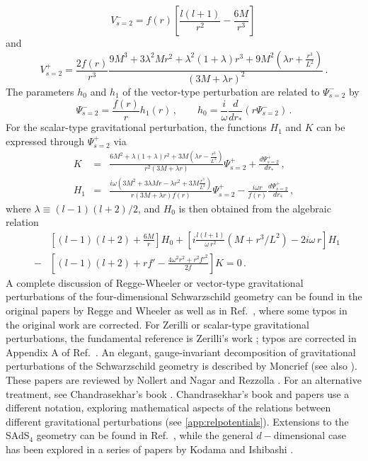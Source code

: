 \documentclass[]{iopart}
\def\beq{\begin{eqnarray}}
\def\eeq{\end{eqnarray}}
\begin{document}
%
\begin{equation}
V_{s=2}^{-}=  f(r)
\left\lbrack\frac{l(l+1)}{r^2}-\frac{6M}{r^3}\right\rbrack\,
\label{vodd}
\end{equation}
%
and 
\begin{equation}
V_{s=2}^{+}= \frac{2f(r)}{r^3}
\frac{9M^3+3\lambda^2Mr^2+\lambda^2\left(1+\lambda\right)r^3+9M^2\left(\lambda
r+\frac{r^3}{L^2}\right)} {\left(3M+\lambda
r\right)^2} \,. \label{veven}
\end{equation}
%
The parameters $h_0$ and $h_1$ of the vector-type perturbation are related to
$\Psi^-_{s=2}$ by
%
\begin{equation}
\Psi^-_{s=2}=  \frac{f(r)}{r} h_1(r)\,,\qquad
h_0=\frac{i}{\omega}\frac{d}{dr_*}\left(r\Psi^-_{s=2}\right)\,.
\label{qodd}
\end{equation}
%
For the scalar-type gravitational perturbation, the functions $H_1$ and $K$
can be expressed through $\Psi^+_{s=2}$ via
%
\begin{eqnarray}
K&=& \frac{6M^2+\lambda \left(1+\lambda\right)r^2+3M\left(\lambda
r-\frac{r^3}{L^2}\right)} {r^2\left(3M+\lambda r\right)}
\Psi^+_{s=2}
+\frac{d\Psi^+_{s=2}}{dr_*} \,, \\
H_1&=& \frac{i\omega\left(3M^2+3\lambda Mr-\lambda r^2+3M
\frac{r^3}{L^2}\right)} {r \left(3M+\lambda r\right)
f(r)}\Psi^+_{s=2} -
\frac{i \omega r}{f(r)}\frac{d\Psi^+_{s=2}}{dr_*}\,, \label{4.11}
\end{eqnarray}
%
where $\lambda\equiv (l-1)(l+2)/2$, and $H_0$ is then obtained from the
algebraic relation
%
\beq
&&\left [(l-1)(l+2)+\frac{6M}{r}\right ]H_0+\left[i\frac{l(l+1)}{\omega\,r^2}(M+r^3/L^2)-2i\omega\,r\right ]H_1\,\nonumber\\
%
&-&\left [(l-1)(l+2)+rf'-\frac{4\omega^2r^2+r^2f'^2}{2f}\right ]K=0\,.
\eeq
%
A complete discussion of Regge-Wheeler or vector-type gravitational
perturbations of the four-dimensional Schwarzschild geometry can be found in
the original papers by Regge and Wheeler \cite{Regge:1957rw} as well as in
Ref.~\cite{Edelstein:1970sk}, where some typos in the original work are
corrected. For Zerilli or scalar-type gravitational perturbations, the
fundamental reference is Zerilli's work \cite{Zerilli:1970se,Zerilli:1971wd};
typos are corrected in Appendix A of Ref.~\cite{Sago:2002fe}. An elegant,
gauge-invariant decomposition of gravitational perturbations of the
Schwarzschild geometry is described by Moncrief \cite{Moncrief:1974am} (see
also \cite{Gerlach:1979rw,Gerlach:1980tx,Sarbach:2001qq,Martel:2005ir}).
These papers are reviewed by Nollert \cite{Nollert:1999ji} and Nagar and
Rezzolla \cite{Nagar:2005ea}. For an alternative treatment, see
Chandrasekhar's book \cite{MTB}. Chandrasekhar's book and papers
\cite{chandrarelation,chandraspecial} use a different notation, exploring
mathematical aspects of the relations between different gravitational
perturbations (see \ref{app:relpotentials}). Extensions to the SAdS$_4$
geometry can be found in Ref.~\cite{Cardoso:2001bb}, while the general
$d-$dimensional case has been explored in a series of papers by Kodama and
Ishibashi \cite{Kodama:2003jz,Ishibashi:2003ap,Kodama:2003kk}.
\end{document}
